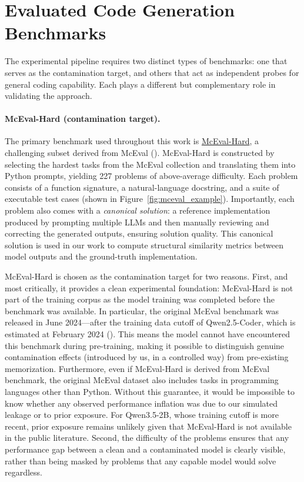 \documentclass[mscthesis]{usiinfthesis}
\begin{document}
\section{Evaluated Code Generation Benchmarks}
\label{sec:benchmarks}
The experimental pipeline requires two distinct types of benchmarks: one that serves as the
contamination target, and others that act as independent probes for general coding capability.
Each plays a different but complementary role in validating the approach.
 
\paragraph{McEval-Hard (contamination target).}
The primary benchmark used throughout this work is \href{https://github.com/Devy99/no-resource-pl-study}{McEval-Hard}, a challenging
subset derived from McEval (\citet{chai2024mcevalmassivelymultilingualcode}). McEval-Hard
is constructed by selecting the hardest tasks from the McEval collection and translating
them into Python prompts, yielding 227 problems of above-average difficulty. Each problem
consists of a function signature, a natural-language docstring, and a suite of executable test
cases (shown in Figure~\ref{fig:mceval_example}). Importantly, each problem also comes with
a \emph{canonical solution}: a reference implementation produced by prompting multiple LLMs
and then manually reviewing and correcting the generated outputs, ensuring solution quality.
This canonical solution is used in our work to compute structural similarity metrics between
model outputs and the ground-truth implementation.
 
McEval-Hard is chosen as the contamination target for two reasons. First, and most
critically, it provides a clean experimental foundation: McEval-Hard is not part of the training
corpus as the model training was completed before the benchmark was available. 
In particular, the original McEval benchmark was released in June 2024---after the training data cutoff of Qwen2.5-Coder, which is estimated
at February 2024 (\citet{hui2024qwen25codertechnicalreport}). This means the model
cannot have encountered this benchmark during pre-training, making it possible to
distinguish genuine contamination effects (introduced by us, in a controlled way) from
pre-existing memorization. 
Furthermore,  even if McEval-Hard is derived from McEval benchmark, the original McEval dataset also includes tasks in programming languages other than Python.
Without this guarantee, it would be impossible to know whether
any observed performance inflation was due to our simulated leakage or to prior exposure.
For Qwen3.5-2B, whose training cutoff is more recent, prior exposure remains unlikely given
that McEval-Hard is not available in the public literature. Second, the difficulty of the problems
ensures that any performance gap between a clean and a contaminated model is clearly
visible, rather than being masked by problems that any capable model would solve
regardless.
 
\end{document}
